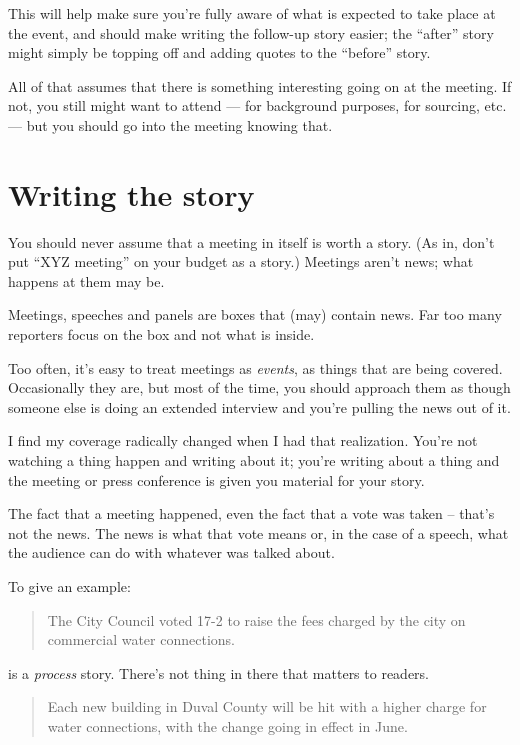 \documentclass[
  11pt,
  american,
  letterpaperpaper,
  extrafontsizes,onecolumn,openright
  ]{memoir}
\begin{document}
This will help make sure you're fully aware of what is expected to take place at the event, and should make writing the follow-up story easier; the \enquote{after} story might simply be topping off and adding quotes to the \enquote{before} story.

All of that assumes that there is something interesting going on at the meeting. If not, you still might want to attend --- for background purposes, for sourcing, etc. --- but you should go into the meeting knowing that.

\hypertarget{writing-the-story}{%
\section*{Writing the story}\label{writing-the-story}}

You should never assume that a meeting in itself is worth a story. (As in, don't put \enquote{XYZ meeting} on your budget as a story.) Meetings aren't news; what happens at them may be.

Meetings, speeches and panels are boxes that (may) contain news. Far too many reporters focus on the box and not what is inside.

Too often, it's easy to treat meetings as \emph{events}, as things that are being covered. Occasionally they are, but most of the time, you should approach them as though someone else is doing an extended interview and you're pulling the news out of it.

I find my coverage radically changed when I had that realization. You're not watching a thing happen and writing about it; you're writing about a thing and the meeting or press conference is given you material for your story.

The fact that a meeting happened, even the fact that a vote was taken -- that's not the news. The news is what that vote means or, in the case of a speech, what the audience can do with whatever was talked about.

To give an example:

\begin{quote}
The City Council voted 17-2 to raise the fees charged by the city on commercial water connections.
\end{quote}

is a \emph{process} story. There's not thing in there that matters to readers.

\begin{quote}
Each new building in Duval County will be hit with a higher charge for water connections, with the change going in effect in June.
\end{quote}
\end{document}
